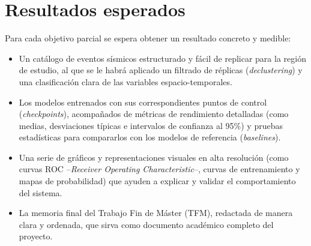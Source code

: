 \section{Resultados esperados}
\label{resultados-esperados}

Para cada objetivo parcial se espera obtener un resultado concreto y medible:

\begin{itemize}
  \item Un catálogo de eventos sísmicos estructurado y fácil de replicar para la región de estudio, al que se le habrá aplicado un filtrado de réplicas (\textit{declustering}) y una clasificación clara de las variables espacio-temporales.
  \item Los modelos entrenados con sus correspondientes puntos de control (\textit{checkpoints}), acompañados de métricas de rendimiento detalladas (como medias, desviaciones típicas e intervalos de confianza al 95\%) y pruebas estadísticas para compararlos con los modelos de referencia (\textit{baselines}).
  \item Una serie de gráficos y representaciones visuales en alta resolución (como curvas ROC --\textit{Receiver Operating Characteristic}--, curvas de entrenamiento y mapas de probabilidad) que ayuden a explicar y validar el comportamiento del sistema.
  \item La memoria final del Trabajo Fin de Máster (TFM), redactada de manera clara y ordenada, que sirva como documento académico completo del proyecto.
\end{itemize}
